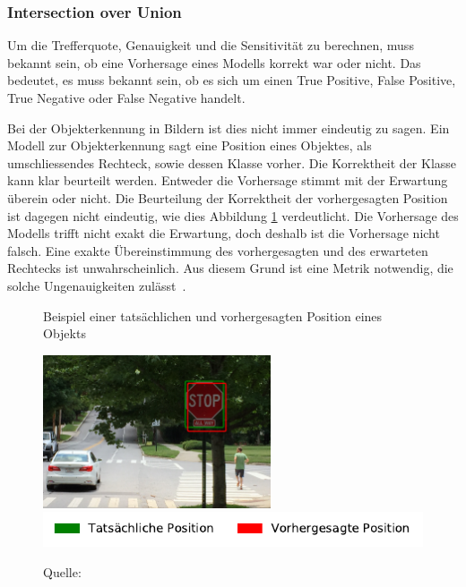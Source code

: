 \subsubsection{Intersection over Union}

Um die Trefferquote, Genauigkeit und die Sensitivität zu berechnen, muss bekannt sein, ob eine Vorhersage eines Modells korrekt war oder nicht. Das bedeutet, es muss bekannt sein, ob es sich um einen True Positive, False Positive, True Negative oder False Negative handelt. 

Bei der Objekterkennung in Bildern ist dies nicht immer eindeutig zu sagen. Ein Modell zur Objekterkennung sagt eine Position eines Objektes, als umschliessendes Rechteck, sowie dessen Klasse vorher. Die Korrektheit der Klasse kann klar beurteilt werden. Entweder die Vorhersage stimmt mit der Erwartung überein oder nicht. Die Beurteilung der Korrektheit der vorhergesagten Position ist dagegen nicht eindeutig, wie dies Abbildung \ref{fig:iou-issue} verdeutlicht. Die Vorhersage des Modells trifft nicht exakt die Erwartung, doch deshalb ist die Vorhersage nicht falsch. Eine exakte Übereinstimmung des vorhergesagten und des erwarteten Rechtecks ist unwahrscheinlich. Aus diesem Grund ist eine Metrik notwendig, die solche Ungenauigkeiten zulässt~\autocite{IoU}.

\begin{figure}[h!]
    \captionsetup{width=.9\linewidth}
    \caption{Beispiel einer tatsächlichen und vorhergesagten Position eines Objekts}
    \label{fig:iou-issue}
    \centering
    \includegraphics[width=0.6\textwidth]{graphics/iou/iou_issue.jpg}\\
    \includegraphics[scale=1]{graphics/matplot/iou_issue_legend.pdf}
    \caption*{Quelle: \textcite{IoU}}
\end{figure}

